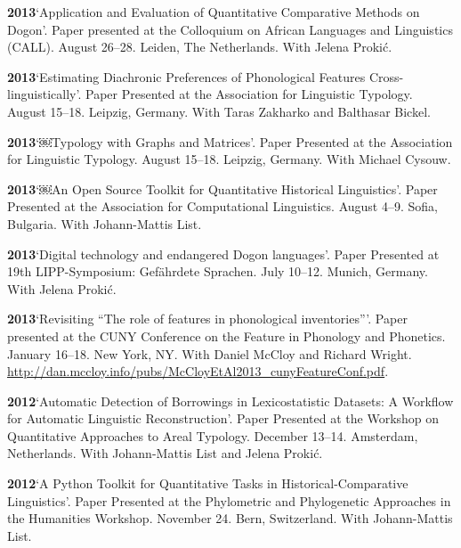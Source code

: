 \documentclass[11pt]{article}
\newcommand{\hangpara}{
 \setlength{\parindent}{0in} %
 \hangindent=0.42in %
}
\begin{document}
\vskip 6pt
\hangpara
{\bf 2013}\hspace{1ex}`Application and Evaluation of Quantitative Comparative Methods on Dogon'. Paper presented at the Colloquium on African Languages and Linguistics (CALL). August 26--28. Leiden, The Netherlands. With Jelena Proki{\'c}.

\vskip 6pt
\hangpara
{\bf 2013}\hspace{1ex}`Estimating Diachronic Preferences of Phonological Features Cross-linguistically'. Paper Presented at the Association for Linguistic Typology. August 15--18. Leipzig, Germany. With Taras Zakharko and Balthasar Bickel.

\vskip 6pt
\hangpara
{\bf 2013}\hspace{1ex}`￼Typology with Graphs and Matrices'. Paper Presented at the Association for Linguistic Typology. August 15--18. Leipzig, Germany. With Michael Cysouw.

\vskip 6pt
\hangpara
{\bf 2013}\hspace{1ex}`￼An Open Source Toolkit for Quantitative Historical Linguistics'. Paper Presented at the Association for Computational Linguistics. August 4--9. Sofia, Bulgaria. With Johann-Mattis List.

\vskip 6pt
\hangpara
{\bf 2013}\hspace{1ex}`Digital technology and endangered Dogon languages'. Paper Presented at 19th LIPP-Symposium: Gef{\"a}hrdete Sprachen. July 10--12. Munich, Germany. With Jelena Proki{\'c}.

\vskip 6pt
\hangpara
{\bf 2013}\hspace{1ex}`Revisiting ``The role of features in phonological inventories'''. Paper presented at the CUNY Conference on the Feature in Phonology and Phonetics. January 16--18. New York, NY. With Daniel McCloy and Richard Wright. \url{http://dan.mccloy.info/pubs/McCloyEtAl2013_cunyFeatureConf.pdf}.

\vskip 6pt
\hangpara
{\bf 2012}\hspace{1ex}`Automatic Detection of Borrowings in Lexicostatistic Datasets: A Workflow for Automatic Linguistic Reconstruction'. Paper Presented at the Workshop on Quantitative Approaches to Areal Typology. December 13--14. Amsterdam, Netherlands. With Johann-Mattis List and Jelena Proki{\'c}.

\vskip 6pt
\hangpara
{\bf 2012}\hspace{1ex}`A Python Toolkit for Quantitative Tasks in Historical-Comparative Linguistics'. Paper Presented at the Phylometric and Phylogenetic Approaches in the Humanities Workshop. November 24. Bern, Switzerland. With Johann-Mattis List.
\end{document}
